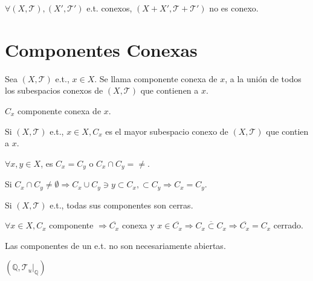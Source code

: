 \begin{obs}
  $\forall ( X, \mathcal{T} ), ( X', \mathcal{T}' )$ e.t. conexos, $( X + X', \mathcal{T} + \mathcal{T}' )$ no es conexo.
\end{obs}

\section{Componentes Conexas}

\begin{defn}
  Sea $( X, \mathcal{T} )$ e.t., $x \in X$. Se llama componente conexa de $x$, a la unión de todos los subespacios conexos de $( X, \mathcal{T} )$ que contienen a $x$.
\end{defn}

\begin{nota}
  $C_{x}$ componente conexa de $x$.
\end{nota}

\begin{obs}
  Si $( X, \mathcal{T} )$ e.t., $x \in X, C_{x}$ es el mayor subespacio conexo de $( X, \mathcal{T} )$ que contien a $x$.
\end{obs}

\begin{obs}
  $\forall x, y \in X$, es $C_{x} = C_{y}$ o $C_{x} \cap C_{y} = \neq$.
\end{obs}

\begin{dem}
  Si $C_{x} \cap C_{y} \neq \emptyset \Rightarrow C_{x} \cup C_{y} \ni y \subset C_{x}, \subset C_{y} \Rightarrow C_{x} = C_{y}$.
\end{dem}

\begin{prop}
  Si $( X, \mathcal{T} )$ e.t., todas sus componentes son cerras.
\end{prop}

\begin{dem}
  $\forall x \in X, C_{x}$ componente $\Rightarrow \overline{C_{x}}$ conexa y $x \in \overline{C_{x}} \Rightarrow \overline{C_{x} \subset C_{x}} \Rightarrow \overline{C_{x}} = C_{x}$ cerrado.
\end{dem}

\begin{obs}
  Las componentes de un e.t. no son necesariamente abiertas.
\end{obs}

\begin{ejm}
  $( \mathbb{Q}, \mathcal{T}_{u}|_{\mathbb{Q}})$
\end{ejm}

